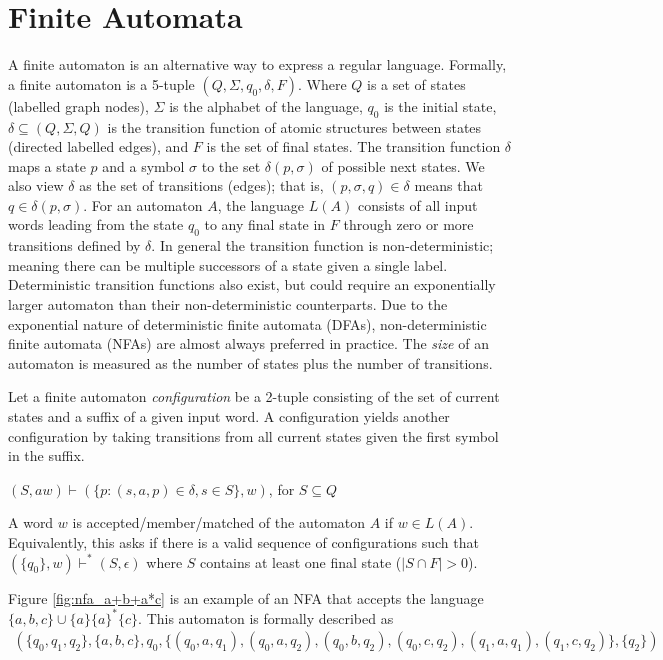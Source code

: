 \section{Finite Automata}
\label{sec:Finite Automata}
A finite automaton is an alternative way to express a regular language. Formally, a finite automaton is a 5-tuple $(Q, \Sigma, q_0, \delta, F)$. Where $Q$ is a set of states (labelled graph nodes), $\Sigma$ is the alphabet of the language, $q_0$ is the initial state, $\delta \subseteq (Q, \Sigma, Q)$ is the transition function of atomic structures between states (directed labelled edges), and $F$ is the set of final states. The transition function $\delta$ maps a state $p$ and a symbol $\sigma$ to the set $\delta(p, \sigma)$ of possible next states. We also view $\delta$ as the set of transitions (edges); that is, $(p, \sigma, q) \in \delta$ means that $q \in \delta(p, \sigma)$. For an automaton $A$, the language $L(A)$ consists of all input words leading from the state $q_0$ to any final state in $F$ through zero or more transitions defined by $\delta$. In general the transition function is non-deterministic; meaning there can be multiple successors of a state given a single label. Deterministic transition functions also exist, but could require an exponentially larger automaton than their non-deterministic counterparts. Due to the exponential nature of deterministic finite automata (DFAs), non-deterministic finite automata (NFAs) are almost always preferred in practice. The \emph{size} of an automaton is measured as the number of states plus the number of transitions.

Let a finite automaton \emph{configuration} be a 2-tuple consisting of the set of current states and a suffix of a given input word. A configuration yields another configuration by taking transitions from all current states given the first symbol in the suffix.
\begin{center}
  $(S, aw) \vdash (\{p : (s, a, p) \in \delta, s \in S\}, w)$, for $S \subseteq Q$
\end{center}
A word $w$ is accepted/member/matched of the automaton $A$ if $w \in L(A)$. Equivalently, this asks if there is a valid sequence of configurations such that $(\{q_0\}, w) \vdash^* (S, \epsilon)$ where $S$ contains at least one final state ($|S \cap F| > 0$).

Figure \ref{fig:nfa_a+b+a*c} is an example of an NFA that accepts the language $\{a, b, c\} \cup \{a\}\{a\}^*\{c\}$. This automaton is formally described as 
\begin{align*}
  (
    \{q_0, q_1, q_2\}, 
    \{a, b, c\}, 
    q_0,
    \{
      (q_0, a, q_1), (q_0, a, q_2), (q_0, b, q_2), (q_0, c, q_2), (q_1, a, q_1), (q_1, c, q_2)
    \}, 
    \{q_2\}
  )
\end{align*} 

